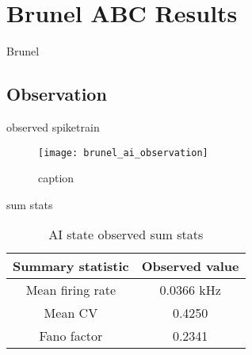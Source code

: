 

\chapter{Brunel ABC Results}

Brunel 

\section{Observation}

observed spiketrain 

\begin{figure}[H]
    \centering
    \texttt{[image: brunel\_ai\_observation]}
    \caption{caption}
    \label{fig:fig1}
\end{figure}

sum stats

\begin{table}[H]
  \caption{AI state observed sum stats}
  \begin{center}
    \begin{tabular}{cc}
      \toprule
      \textbf{Summary statistic} & \textbf{Observed value} \\
      \midrule
      Mean firing rate &  0.0366 kHz \\
      Mean CV &  0.4250  \\
      Fano factor & 0.2341  \\
      \bottomrule
    \end{tabular}
  \end{center}
  \label{tab:hh_noisy_sumstats}
\end{table}

